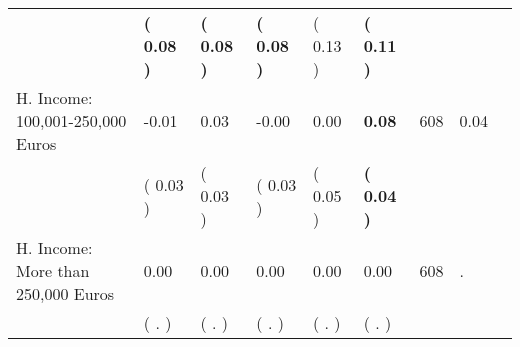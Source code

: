 \begin{tabular}{L{6.2cm} C{1.8cm} C{1.8cm} C{1.8cm} C{1.8cm} C{1.8cm} C{1.8cm} C{0.3cm} C{0.3cm}}
 & \textbf{(     0.08 )} & \textbf{(     0.08 )} & \textbf{(     0.08 )} & (     0.13 ) & \textbf{(     0.11 )}  & \\
H. Income: 100,001-250,000 Euros &     -0.01 &      0.03 &     -0.00 &      0.00 & \textbf{     0.08}  & 608 &       0.04 \\ 
 & (     0.03 ) & (     0.03 ) & (     0.03 ) & (     0.05 ) & \textbf{(     0.04 )}  & \\
H. Income: More than 250,000 Euros &      0.00 &      0.00 &      0.00 &      0.00 &      0.00  & 608 &          . \\ 
 & (        . ) & (        . ) & (        . ) & (        . ) & (        . )  & \\
\bottomrule
\end{tabular}
